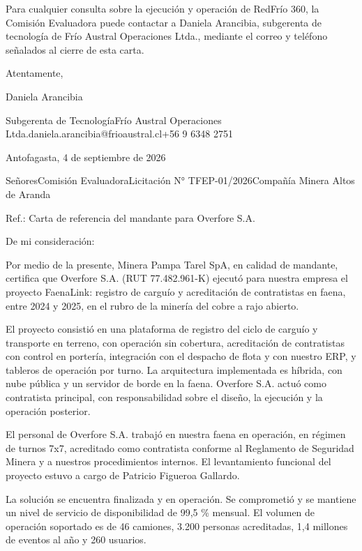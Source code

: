 \documentclass[anexo]{../../comun/overfore}
\begin{document}
Para cualquier consulta sobre la ejecución y operación de RedFrío 360, la Comisión Evaluadora puede contactar a Daniela Arancibia, subgerenta de tecnología de Frío Austral Operaciones Ltda., mediante el correo y teléfono señalados al cierre de esta carta.

Atentamente,

Daniela Arancibia

Subgerenta de Tecnología\newline Frío Austral Operaciones Ltda.\newline daniela.arancibia@frioaustral.cl\newline +56 9 6348 2751

\enlargethispage{4\baselineskip}
Antofagasta, 4 de septiembre de 2026

Señores\newline Comisión Evaluadora\newline Licitación N° TFEP-01/2026\newline Compañía Minera Altos de Aranda

Ref.: Carta de referencia del mandante para Overfore S.A.

De mi consideración:

Por medio de la presente, Minera Pampa Tarel SpA, en calidad de mandante, certifica que Overfore S.A. (RUT 77.482.961-K) ejecutó para nuestra empresa el proyecto FaenaLink: registro de carguío y acreditación de contratistas en faena, entre 2024 y 2025, en el rubro de la minería del cobre a rajo abierto.

El proyecto consistió en una plataforma de registro del ciclo de carguío y transporte en terreno, con operación sin cobertura, acreditación de contratistas con control en portería, integración con el despacho de flota y con nuestro ERP, y tableros de operación por turno. La arquitectura implementada es híbrida, con nube pública y un servidor de borde en la faena. Overfore S.A. actuó como contratista principal, con responsabilidad sobre el diseño, la ejecución y la operación posterior.

El personal de Overfore S.A. trabajó en nuestra faena en operación, en régimen de turnos 7x7, acreditado como contratista conforme al Reglamento de Seguridad Minera y a nuestros procedimientos internos. El levantamiento funcional del proyecto estuvo a cargo de Patricio Figueroa Gallardo.

La solución se encuentra finalizada y en operación. Se comprometió y se mantiene un nivel de servicio de disponibilidad de 99,5 \% mensual. El volumen de operación soportado es de 46 camiones, 3.200 personas acreditadas, 1,4 millones de eventos al año y 260 usuarios.
\end{document}

